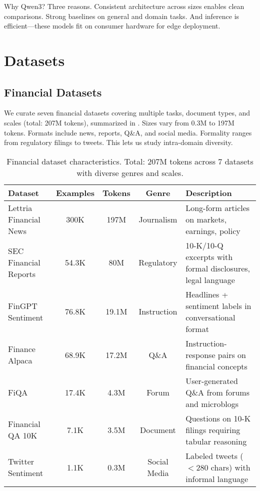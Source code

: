 Why Qwen3? Three reasons. Consistent architecture across sizes enables clean comparisons. Strong baselines on general and domain tasks. And inference is efficient—these models fit on consumer hardware for edge deployment.

\section{Datasets}

\subsection{Financial Datasets}

We curate seven financial datasets covering multiple tasks, document types, and scales (total: 207M tokens), summarized in . Sizes vary from 0.3M to 197M tokens. Formats include news, reports, Q\&A, and social media. Formality ranges from regulatory filings to tweets. This lets us study intra-domain diversity.

\begin{table}[h]
\centering
\caption[Financial Dataset Characteristics]{Financial dataset characteristics. Total: 207M tokens across 7 datasets with diverse genres and scales.}
\label{tab:financial_datasets}
\small
\begin{tabular}{p{3cm}cccp{5.5cm}}
\toprule
\textbf{Dataset} & \textbf{Examples} & \textbf{Tokens} & \textbf{Genre} & \textbf{Description} \\
\midrule
Lettria Financial News & 300K & 197M & Journalism & Long-form articles on markets, earnings, policy \\
\midrule
SEC Financial Reports & 54.3K & 80M & Regulatory & 10-K/10-Q excerpts with formal disclosures, legal language \\
\midrule
FinGPT Sentiment & 76.8K & 19.1M & Instruction & Headlines + sentiment labels in conversational format \\
\midrule
Finance Alpaca & 68.9K & 17.2M & Q\&A & Instruction-response pairs on financial concepts \\
\midrule
FiQA & 17.4K & 4.3M & Forum & User-generated Q\&A from forums and microblogs \\
\midrule
Financial QA 10K & 7.1K & 3.5M & Document & Questions on 10-K filings requiring tabular reasoning \\
\midrule
Twitter Sentiment & 1.1K & 0.3M & Social Media & Labeled tweets ($<$280 chars) with informal language \\
\bottomrule
\end{tabular}
\end{table}

